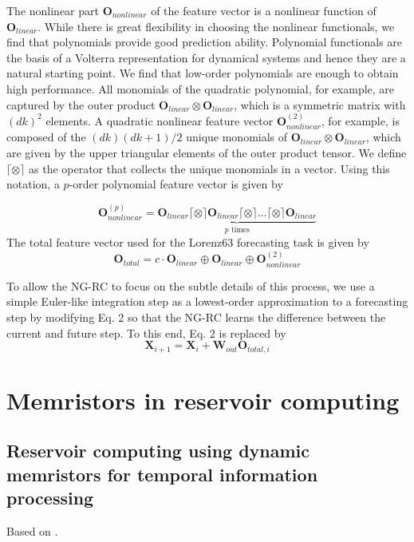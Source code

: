 \documentclass[11pt, oneside]{article}
\begin{document}
The nonlinear part \(\mathbf{O}_{nonlinear}\) of the feature vector is a nonlinear function of \(\mathbf{O}_{linear}\). While there is great flexibility in choosing the nonlinear functionals, we find that polynomials provide good prediction ability. Polynomial functionals are the basis of a Volterra representation for dynamical systems and hence they are a natural starting point. We find that low-order polynomials are enough to obtain high performance.
All monomials of the quadratic polynomial, for example, are captured by the outer product \(\mathbf{O}_{linear} \otimes \mathbf{O}_{linear}\), which is a symmetric
matrix with \((dk)^2\) elements. A quadratic nonlinear feature vector \(\mathbf{O}^{(2)}_{nonlinear}\), for example, is composed of the \((dk)(dk+1)/2\) unique monomials of \(\mathbf{O}_{linear} \otimes \mathbf{O}_{linear}\), which are given by the upper triangular elements of the outer product tensor. We define \(\lceil \otimes \rceil\) as the operator that collects the unique monomials in a vector. Using this notation, a \(p\)-order polynomial feature vector is given by

\begin{equation}
    \mathbf{O}^{(p)}_{nonlinear} =  \underbrace{\mathbf{O}_{linear} \lceil \otimes \rceil \mathbf{O}_{linear} \lceil \otimes \rceil \ldots \lceil \otimes \rceil \mathbf{O}_{linear} }_{p \text{ times}}
\end{equation}
The total feature vector used for the Lorenz63 forecasting task is given by
\begin{equation}
    \mathbf{O}_{total} = c \cdot \mathbf{O}_{linear} \oplus \mathbf{O}_{linear}  \oplus  \mathbf{O}^{(2)}_{nonlinear}
\end{equation}

To allow the NG-RC to focus on the subtle details of this process, we use a simple Euler-like integration step as a lowest-order approximation to a forecasting step by modifying Eq. 2 so that the NG-RC learns the difference between the current and future step. To this end, Eq. 2 is replaced by
\begin{equation}
    \mathbf{X}_{i+1} = \mathbf{X}_i + \mathbf{W}_{out} \mathbf{O}_{total,i}
\end{equation}

\section{Memristors in reservoir computing}

\subsection{Reservoir computing using dynamic memristors for temporal information processing}
Based on \autocite{Du2017,Hwang2025}.
\end{document}
